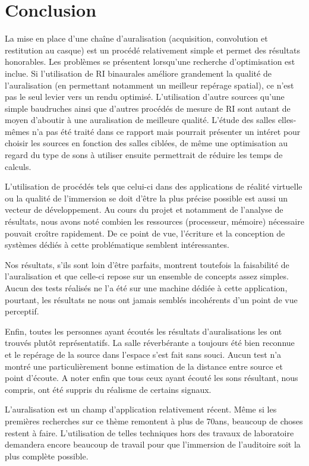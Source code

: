 \chapter*{Conclusion}

La mise en place d'une chaîne d'auralisation (acquisition, convolution et restitution au casque) est un procédé
relativement simple et permet des résultats honorables.
Les problèmes se présentent lorsqu'une recherche d'optimisation est inclue. Si l'utilisation de RI binaurales améliore
grandement la qualité de l'auralisation (en permettant notamment un meilleur repérage spatial), ce n'est pas le seul
levier vers un rendu optimisé. L'utilisation d'autre sources qu'une simple baudruches ainsi que d'autres procédés de
mesure de RI sont autant de moyen d'aboutir à une auralisation de meilleure qualité.
L'étude des salles elles-mêmes n'a pas été traité dans ce rapport mais pourrait présenter un intéret pour choisir les
sources en fonction des salles ciblées, de même une optimisation au regard du type de sons à utiliser ensuite
permettrait de réduire les temps de calculs.

L'utilisation de procédés tels que celui-ci dans des applications de réalité virtuelle ou la qualité de l'immersion se
doit d'être la plus précise possible est aussi un vecteur de développement. Au cours du projet et notamment de l'analyse
de résultats, nous avons noté combien les ressources (processeur, mémoire) nécessaire pouvait croître rapidement. De ce
point de vue, l'écriture et la conception de systèmes dédiés à cette problématique semblent intéressantes.

Nos résultats, s'ils sont loin d'être parfaits, montrent toutefois la faisabilité de l'auralisation et que celle-ci
repose sur un ensemble de concepts assez simples.
Aucun des tests réalisés ne l'a été sur une machine dédiée à cette application, pourtant, les résultats ne nous ont
jamais semblés incohérents d'un point de vue perceptif.

Enfin, toutes les personnes ayant écoutés les résultats d'auralisations les ont trouvés plutôt représentatifs. La salle
réverbérante a toujours été bien reconnue et le repérage de la source dans l'espace s'est fait sans souci.
Aucun test n'a montré une particulièrement bonne estimation de la distance entre source et point d'écoute.
A noter enfin que tous ceux ayant écouté les sons résultant, nous compris, ont été suppris du réalisme de certains signaux.

L'auralisation est un champ d'application relativement récent. Même si les premières recherches sur ce thème remontent à
plus de 70ans, beaucoup de choses restent à faire.
L'utilisation de telles techniques hors des travaux de laboratoire demandera encore beaucoup de travail pour que
l'immersion de l'auditoire soit la plus complète possible.
